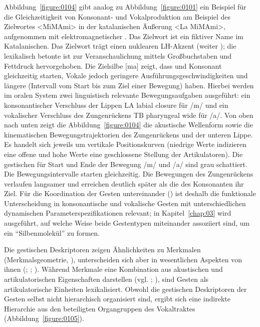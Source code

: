 \newpage  
\largerpage
Abbildung~\ref{figure:0104} gibt analog zu Abbildung~\ref{figure:0101} ein Beispiel für die Gleichzeitigkeit von Konsonant- und Vokalproduktion am Beispiel des Zielwortes <MiMAmi> in der katalanischen Äußerung <La MiMAmi>, aufgenommen mit elektromagnetischer . Das Zielwort ist ein fiktiver Name im Katalanischen. Das Zielwort trägt einen nuklearen LH-Akzent (weiter ); die lexikalisch betonte  ist zur Veranschaulichung mittels Großbuchstaben und Fettdruck hervorgehoben. Die Zielsilbe [ma] zeigt, dass  und Konsonant gleichzeitig starten, Vokale jedoch geringere Ausführungsgeschwindigkeiten und längere  (Intervall vom Start bis zum Ziel einer Bewegung) haben. Hierbei werden im oralen System zwei linguistisch relevante Bewegungsaufgaben ausgeführt: ein konsonantischer Verschluss der Lippen {LA labial closure} für /m/ und ein vokalischer Verschluss des Zungenrückens {TB pharyngeal wide} für /a/. Von oben nach unten zeigt die Abbildung~\ref{figure:0104} die akustische Wellenform sowie die kinematischen Bewegungstrajektorien des Zungenrückens und der unteren Lippe. Es handelt sich jeweils um vertikale Positionskurven (niedrige Werte indizieren eine offene und hohe Werte eine geschlossene Stellung der Artikulatoren). Die gestischen  für Start und Ende der Bewegung /m/ und /a/ sind grau schattiert. Die Bewegungsintervalle starten gleichzeitig. Die Bewegungen des Zungenrückens verlaufen langsamer und erreichen deutlich später als die des Konsonanten ihr Ziel. Für die Koordination der Gesten untereinander () ist deshalb die funktionale Unterscheidung in konsonantische und vokalische Gesten mit unterschiedlichen dynamischen Parameterspezifikationen relevant; in Kapitel~\ref{chap:03} wird ausgeführt, auf welche Weise beide Gestentypen miteinander assoziiert sind, um ein \enquote{Silbenmolekül} zu formen. 


Die gestischen Deskriptoren zeigen Ähnlichkeiten zu Merkmalen (Merkmalsgeometrie, \citealt{Clements1985}), unterscheiden sich aber in wesentlichen Aspekten von ihnen (\citealt{Browman1989}; \citealt{Browman1992a}; \citealt{Pouplier2011a}). Während Merkmale eine Kombination aus akustischen und artikulatorischen Eigenschaften darstellen (vgl. \citealt{Pike1943}; \citealt{Ladefoged1996}), sind Gesten als artikulatorische Einheiten lexikalisiert. Obwohl die gestischen Deskriptoren der Gesten selbst nicht hierarchisch organisiert sind, ergibt sich eine indirekte Hierarchie aus den beteiligten Organgruppen des Vokaltraktes (Abbildung~\ref{figure:0105}). 

